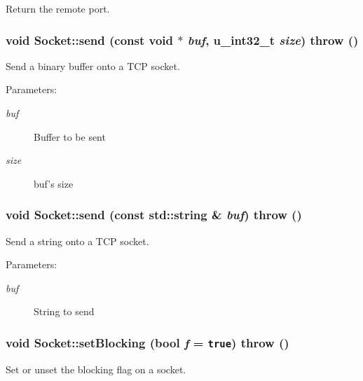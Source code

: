 Return the remote port. 

\hypertarget{classSocket_e19472a87361143b4e3e2730e69b5955}{
\subsubsection[{send}]{\setlength{\rightskip}{0pt plus 5cm}void Socket::send (const void $\ast$ {\em buf}, \/  u\_\-int32\_\-t {\em size})  throw ()}}
\label{classSocket_e19472a87361143b4e3e2730e69b5955}


Send a binary buffer onto a TCP socket. 

\begin{Desc}
\item[Parameters:]
\begin{description}
\item[{\em buf}]Buffer to be sent \item[{\em size}]buf's size \end{description}
\end{Desc}
\hypertarget{classSocket_d9819dba14b732d575bf3dc1e376677c}{
\subsubsection[{send}]{\setlength{\rightskip}{0pt plus 5cm}void Socket::send (const std::string \& {\em buf})  throw ()}}
\label{classSocket_d9819dba14b732d575bf3dc1e376677c}


Send a string onto a TCP socket. 

\begin{Desc}
\item[Parameters:]
\begin{description}
\item[{\em buf}]String to send \end{description}
\end{Desc}
\hypertarget{classSocket_cb7309a2f56ab9ed7769dccb39178200}{
\subsubsection[{setBlocking}]{\setlength{\rightskip}{0pt plus 5cm}void Socket::setBlocking (bool {\em f} = {\tt true})  throw ()}}
\label{classSocket_cb7309a2f56ab9ed7769dccb39178200}


Set or unset the blocking flag on a socket. 

